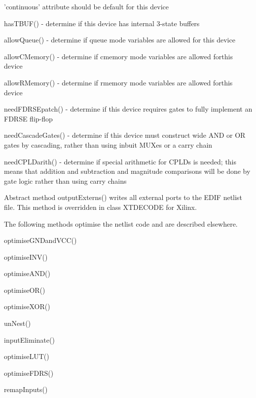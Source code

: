         'continuous' attribute should be default for this device
\item   hasTBUF() - determine if this device has internal 3-state
        buffers
\item   allowQueue() - determine if queue mode variables are allowed for
        this device
\item   allowCMemory() - determine if cmemory mode variables are allowed
        forthis device
\item   allowRMemory() - determine if rmemory mode variables are allowed
        forthis device
\item   needFDRSEpatch() - determine if this device requires gates to
        fully implement an FDRSE flip-flop
\item   needCascadeGates() - determine if this device must construct
        wide AND or OR gates by cascading, rather than using inbuit
        MUXes or a carry chain
\item   needCPLDarith() - determine if special arithmetic for CPLDs is
        needed; this means that addition and subtraction and magnitude
        comparisons will be done by gate logic rather than using carry
        chains
\blend

Abstract method outputExterns() writes all external ports to the EDIF netlist
file. This method is overridden in class XTDECODE for Xilinx.

The following methods optimise the netlist code and are described
elsewhere.
\blist
\item   optimiseGNDandVCC()
\item   optimiseINV()
\item   optimiseAND()
\item   optimiseOR()
\item   optimiseXOR()
\item   unNest()
\item   inputEliminate()
\item   optimiseLUT()
\item   optimiseFDRS()
\item   remapInputs()
\blend









